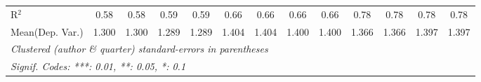 \begin{tabular}{lcccccccccccc}
   R$^2$                                    & 0.58         & 0.58     & 0.59    & 0.59     & 0.66         & 0.66          & 0.66        & 0.66         & 0.78    & 0.78          & 0.78    & 0.78\\  
Mean(Dep. Var.) & 1.300 & 1.300 & 1.289 & 1.289 & 1.404 & 1.404 & 1.400 & 1.400 & 1.366 & 1.366 & 1.397 & 1.397 \\
   \midrule \midrule
   \multicolumn{13}{l}{\emph{Clustered (author \& quarter) standard-errors in parentheses}}\\
   \multicolumn{13}{l}{\emph{Signif. Codes: ***: 0.01, **: 0.05, *: 0.1}}\\
\end{tabular}
\par\endgroup
